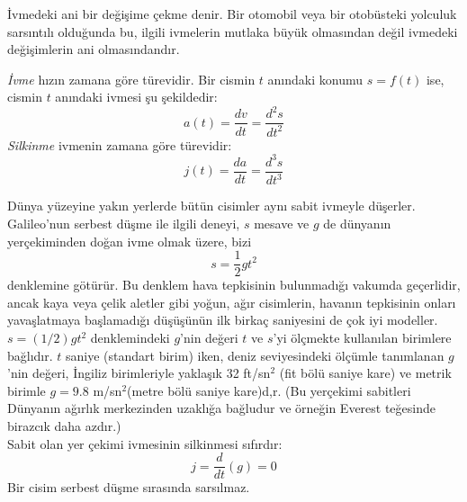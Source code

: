 İvmedeki ani bir değişime çekme denir. Bir otomobil veya bir otobüsteki yolculuk sarsıntılı olduğunda bu, ilgili ivmelerin mutlaka büyük olmasından değil ivmedeki değişimlerin ani olmasındandır.
\begin{tanim}
	\textit{İvme} hızın zamana göre türevidir. Bir cismin $t$ anındaki konumu $s=f(t)$ ise, cismin $t$ anındaki ivmesi şu şekildedir:
	\begin{equation*}
	a(t)=\frac{dv}{dt}=\frac{d^2 s}{dt^2}
	\end{equation*}
	\textit{Silkinme} ivmenin zamana göre türevidir:
	\begin{equation*}
	j(t)=\frac{da}{dt}=\frac{d^3 s}{dt^3}
	\end{equation*}
\end{tanim}
Dünya yüzeyine yakın yerlerde bütün cisimler aynı sabit ivmeyle düşerler. Galileo'nun serbest düşme ile ilgili deneyi, $s$ mesave ve $g$ de dünyanın yerçekiminden doğan ivme olmak üzere, bizi
	\begin{equation*}
	s=\frac{1}{2}gt^2
	\end{equation*}
denklemine götürür. Bu denklem hava tepkisinin bulunmadığı vakumda geçerlidir, ancak kaya veya çelik aletler gibi yoğun, ağır cisimlerin, havanın tepkisinin onları yavaşlatmaya başlamadığı düşüşünün ilk birkaç saniyesini de çok iyi modeller.\\
	$s =(1/2)gt^2$ denklemindeki $g$'nin değeri $t$ ve $s$'yi ölçmekte kullanılan birimlere bağlıdır. $t$ saniye (standart birim) iken, deniz seviyesindeki ölçümle tanımlanan $g$'nin değeri, İngiliz birimleriyle yaklaşık 32 ft/sn$^2$ (fit bölü saniye kare) ve metrik birimle $g=9.8$ m/sn$^2$(metre bölü saniye kare)d,r. (Bu yerçekimi sabitleri Dünyanın ağırlık merkezinden uzaklığa bağludur ve örneğin Everest teğesinde birazcık daha azdır.)\\
	Sabit olan yer çekimi ivmesinin silkinmesi sıfırdır:
	\begin{equation*}
	j=\frac{d}{dt}(g)=0
	\end{equation*}
Bir cisim serbest düşme sırasında sarsılmaz.

